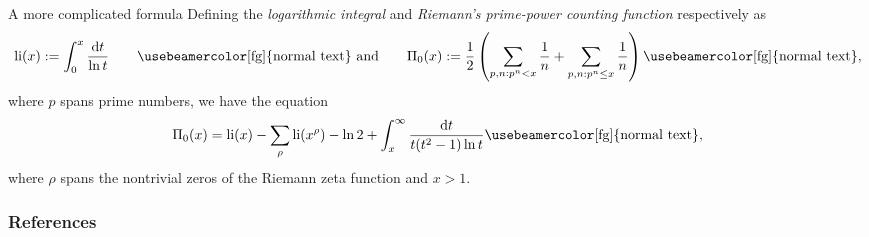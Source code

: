\documentclass[17pt, t, lualatex]{beamer}
\begin{document}
\begin{frame}
\begin{block}{A more complicated formula {\cite{Riemann1859}}}
Defining the \emph{logarithmic integral} and \emph{Riemann's prime-power counting function} respectively as
\[
\textnormal{li}(x) := \int_0^x \frac{\textnormal{d}t}{\ln t}
\qquad \textnormal{\usebeamercolor[fg]{normal text} and} \qquad
\Pi_0(x) := \frac{1}{2} \left( \sum_{p, n: p^n < x} \frac{1}{n} + \sum_{p, n: p^n \leq x} \frac{1}{n} \right) \textnormal{\usebeamercolor[fg]{normal text},}
\]
where $p$ spans prime numbers, we have the equation
\[
\Pi_0(x) = \textnormal{li}(x) - \sum_{\rho} \textnormal{li}(x^\rho) - \ln 2 + \int_x^\infty \frac{\textnormal{d}t}{t (t^2 - 1) \ln t} \textnormal{\usebeamercolor[fg]{normal text},}
\]
where $\rho$ spans the nontrivial zeros of the Riemann zeta function and $x > 1$.
\end{block}
\end{frame}


\begin{frame}
\insertlines
\frametitle{References}


\end{frame}

\insertendpage
\end{document}
